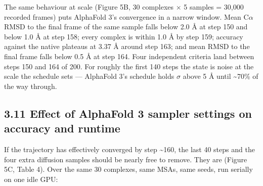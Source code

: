 \documentclass[
  11pt,
]{article}
\begin{document}
The same behaviour at scale (Figure 5B, 30 complexes \ensuremath{\times} 5 samples =
30,000 recorded frames) puts AlphaFold 3's convergence in a narrow
window. Mean C\ensuremath{\alpha} RMSD to the final frame of the same sample falls below
2.0 \AA{} at step 150 and below 1.0 \AA{} at step 158; every complex is within
1.0 \AA{} by step 159; accuracy against the native plateaus at 3.37 \AA{} around
step 163; and mean RMSD to the final frame falls below 0.5 \AA{} at step
164. Four independent criteria land between steps 150 and 164 of 200.
For roughly the first 140 steps the state is noise at the scale the
schedule sets --- AlphaFold 3's schedule holds \ensuremath{\sigma} above 5 \AA{} until
\textasciitilde70\% of the way through.

\subsection{3.11 Effect of AlphaFold 3 sampler settings on accuracy and
runtime}\label{effect-of-alphafold-3-sampler-settings-on-accuracy-and-runtime}

If the trajectory has effectively converged by step \textasciitilde160,
the last 40 steps and the four extra diffusion samples should be nearly
free to remove. They are (Figure 5C, Table 4). Over the same 30
complexes, same MSAs, same seeds, run serially on one idle GPU:
\end{document}
